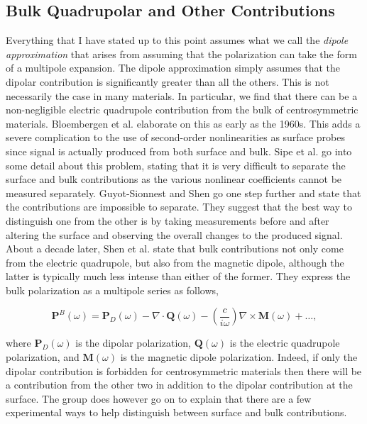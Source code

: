 \subsection{Bulk Quadrupolar and Other Contributions}\label{chap_theory_quad}
Everything that I have stated up to this point assumes what we call the \emph{dipole approximation} that arises from assuming that the polarization can take the form of a multipole expansion. The dipole approximation simply assumes that the dipolar contribution is significantly greater than all the others. This is not necessarily the case in many materials. In particular, we find that there can be a non-negligible electric quadrupole contribution from the bulk of centrosymmetric materials. Bloembergen et al. \cite{PhysRev.174.813} elaborate on this as early as the 1960s. This adds a severe complication to the use of second-order nonlinearities as surface probes since signal is actually produced from both surface and bulk. Sipe et al. \cite{sipe1987fundamental} go into some detail about this problem, stating that it is very difficult to separate the surface and bulk contributions as the various nonlinear coefficients cannot be measured separately. Guyot-Sionnest and Shen \cite{PhysRevB.38.7985} go one step further and state that the contributions are impossible to separate. They suggest that the best way to distinguish one from the other is by taking measurements before and after altering the surface and observing the overall changes to the produced signal. About a decade later, Shen et al. \cite{shen1999surface} state that bulk contributions not only come from the electric quadrupole, but also from the magnetic dipole, although the latter is typically much less intense than either of the former. They express the bulk polarization as a multipole series as follows,

\begin{equation}
\mathbf{P}^{B}(\omega) = \mathbf{P}_{D}(\omega) - \nabla\cdot\mathbf{Q}(\omega) - \left(\frac{c}{i\omega}\right)\nabla\times\mathbf{M}(\omega) + \ldots,
\end{equation}

where $\mathbf{P}_{D}(\omega)$ is the dipolar polarization, $\mathbf{Q}(\omega)$ is the electric quadrupole polarization, and $\mathbf{M}(\omega)$ is the magnetic dipole polarization. Indeed, if only the dipolar contribution is forbidden for centrosymmetric materials then there will be a contribution from the other two in addition to the dipolar contribution at the surface. The group does however go on to explain that there are a few experimental ways to help distinguish between surface and bulk contributions.

